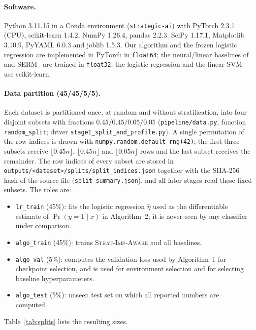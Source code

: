 \paragraph{Software.}
Python 3.11.15 in a Conda environment (\texttt{strategic-ai}) with
PyTorch 2.3.1 (CPU), scikit-learn 1.4.2, NumPy 1.26.4, pandas 2.2.3,
SciPy 1.17.1, Matplotlib 3.10.9, PyYAML 6.0.3 and joblib 1.5.3. Our algorithm
and the frozen logistic regression are implemented in PyTorch in
\texttt{float64}; the neural/linear baselines of
\citet{attias2025pac} and \textsc{SERM}~\cite{levanon2022generalized} are
trained in \texttt{float32}; the logistic regression and the linear SVM use
scikit-learn.

\paragraph{Data partition (45/45/5/5).}
Each dataset is partitioned once, at random and without stratification, into
four disjoint subsets with fractions $0.45/0.45/0.05/0.05$
(\texttt{pipeline/data.py}, function \texttt{random\_split}; driver
\texttt{stage1\_split\_and\_profile.py}). A single permutation of the row
indices is drawn with \texttt{numpy.random.default\_rng(42)}; the first three
subsets receive $\lfloor 0.45n\rfloor$, $\lfloor 0.45n\rfloor$ and
$\lfloor 0.05n\rfloor$ rows and the last subset receives the remainder. The
row indices of every subset are stored in
\texttt{outputs/<dataset>/splits/split\_indices.json} together with the SHA-256
hash of the source file (\texttt{split\_summary.json}), and all later stages
read these fixed subsets. The roles are:
\begin{itemize}
  \item \texttt{lr\_train} (45\%): fits the logistic regression
        $\widehat{\eta}$ used as the differentiable estimate of
        $\Pr(y=1\mid x)$ in Algorithm~2; it is never seen by any classifier
        under comparison.
  \item \texttt{algo\_train} (45\%): trains \textsc{Strat-Imp-Aware} and all
        baselines.
  \item \texttt{algo\_val} (5\%): computes the validation loss used by
        Algorithm~1 for checkpoint selection, and is used for environment
        selection and for selecting baseline hyperparameters.
  \item \texttt{algo\_test} (5\%): unseen test set on which all reported
        numbers are computed.
\end{itemize}
Table~\ref{tab:splits} lists the resulting sizes.

